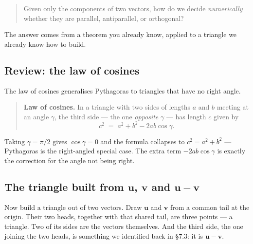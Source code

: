 \documentclass[11pt]{article}
\theoremstyle{definition}
\theoremstyle{remark}
\newcommand{\vc}[1]{\mathbf{#1}}
\begin{document}
\begin{quote}
Given only the components of two vectors, how do we decide \emph{numerically}
whether they are parallel, antiparallel, or orthogonal?
\end{quote}

\noindent The answer comes from a theorem you already know, applied to a
triangle we already know how to build.

\subsection{Review: the law of cosines}
The law of cosines generalises Pythagoras to triangles that have no right angle.

\begin{quote}
\textbf{Law of cosines.} In a triangle with two sides of lengths $a$ and $b$
meeting at an angle $\gamma$, the third side --- the one \emph{opposite}
$\gamma$ --- has length $c$ given by
\[
  c^{2} \;=\; a^{2}+b^{2}-2ab\cos\gamma .
\]
\end{quote}

\begin{center}
\end{center}

\noindent Taking $\gamma=\pi/2$ gives $\cos\gamma=0$ and the formula collapses to
$c^{2}=a^{2}+b^{2}$ --- Pythagoras is the right-angled special case. The extra
term $-2ab\cos\gamma$ is exactly the correction for the angle not being right.

\subsection{The triangle built from \texorpdfstring{$\vc u$, $\vc v$ and $\vc u-\vc v$}{u, v and u - v}}
Now build a triangle out of two vectors. Draw $\vc{u}$ and $\vc{v}$ from a
common tail at the origin. Their two heads, together with that shared tail, are
three points --- a triangle. Two of its sides are the vectors themselves. And
the third side, the one joining the two heads, is something we identified back
in \S7.3: it is $\vc{u}-\vc{v}$.
\end{document}
